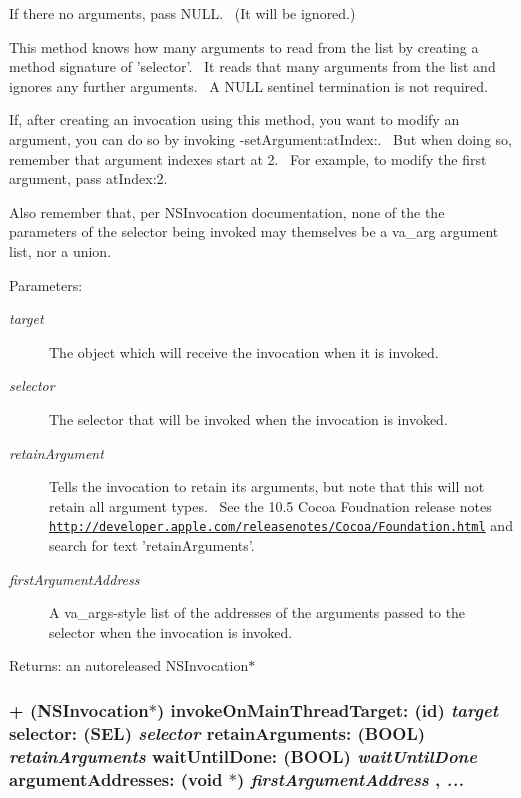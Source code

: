 If there no arguments, pass NULL.~ (It will be ignored.)

This method knows how many arguments to read from the list by creating a method signature of 'selector'.~ It reads that many arguments from the list and ignores any further arguments.~ A NULL sentinel termination is not required.

If, after creating an invocation using this method, you want to modify an argument, you can do so by invoking -setArgument:atIndex:.~ But when doing so, remember that argument indexes start at 2.~ For example, to modify the first argument, pass atIndex:2.

Also remember that, per NSInvocation documentation, none of the the parameters of the selector being invoked may themselves be a va\_\-arg argument list, nor a union.

\begin{Desc}
\item[Parameters:]
\begin{description}
\item[{\em target}]The object which will receive the invocation when it is invoked. \item[{\em selector}]The selector that will be invoked when the invocation is invoked. \item[{\em retainArgument}]Tells the invocation to retain its arguments, but note that this will not retain all argument types.~ See the 10.5 Cocoa Foudnation release notes \href{http://developer.apple.com/releasenotes/Cocoa/Foundation.html}{\tt http://developer.apple.com/releasenotes/Cocoa/Foundation.html} and search for text 'retainArguments'. \item[{\em firstArgumentAddress}]A va\_\-args-style list of the addresses of the arguments passed to the selector when the invocation is invoked. \end{description}
\end{Desc}
\begin{Desc}
\item[Returns:]an autoreleased NSInvocation$\ast$ \end{Desc}
\hypertarget{interface_n_s_invocation_07_quick_08_e94eccaa8ebb49c224133f416ed60208}{
\subsubsection[{invokeOnMainThreadTarget:selector:retainArguments:waitUntilDone:argumentAddresses:}]{\setlength{\rightskip}{0pt plus 5cm}+ (NSInvocation$\ast$) invokeOnMainThreadTarget: (id) {\em target}\/ selector: (SEL) {\em selector}\/ retainArguments: (BOOL) {\em retainArguments}\/ waitUntilDone: (BOOL) {\em waitUntilDone}\/ argumentAddresses: (void $\ast$) {\em firstArgumentAddress}\/ ,  {\em ...}}}
\label{interface_n_s_invocation_07_quick_08_e94eccaa8ebb49c224133f416ed60208}



